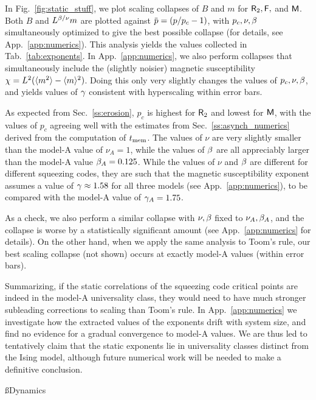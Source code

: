 \documentclass[pra,aps,twocolumn,groupedaddress,superscriptaddress,nofootinbib,preprintnumbers]{revtex4-2}
\begin{document}
	In Fig.~\ref{fig:static_stuff}, we plot scaling collapses of $B$ and $m$ for $\mathsf{R}_2,\mathsf{F},$ and $\mathsf{M}$. Both $B$ and $L^{\beta / \nu} m$ are plotted against $\ob p =  (p/p_c-1)$, with $p_c,\nu,\beta$ simultaneously optimized to give the best possible collapse (for details, see App.~\ref{app:numerics}). This analysis yields the values collected in Tab.~\ref{tab:exponents}. In App.~\ref{app:numerics}, we also perform collapses that simultaneously include the (slightly noisier) magnetic susceptibility $\chi = L^2 (\langle m^2 \rangle - \langle m\rangle^2)$. Doing this only very slightly changes the values of $p_c,\nu,\beta$, and yields values of $\gamma$ consistent with hyperscaling within error bars. 
	
	As expected from Sec.~\ref{ss:erosion}, $p_c$ is highest for $\mathsf{R}_2$ and lowest for $\mathsf{M}$, with the values of $p_c$ agreeing well with the estimates from Sec.~\ref{ss:asynch_numerics} derived from the computation of $t_{\rm mem}$. The values of $\nu$ are very slightly smaller than the model-A value of $\nu_A = 1$, while the values of $\beta$ are all appreciably larger than the model-A value $\beta_A= 0.125$. While the values of $\nu$ and $\beta$ are different for different squeezing codes, they are such that the magnetic susceptibility exponent assumes a value of $\gamma \approx 1.58$ for all three models (see App.~\ref{app:numerics}), to be compared with the model-A value of $\gamma_A = 1.75$. 
	
	As a check, we also perform a similar collapse with $\nu,\beta$ fixed to $\nu_A,\beta_A$, and the collapse is worse by a statistically significant amount (see  App.~\ref{app:numerics} for details). On the other hand, when we apply the same analysis to Toom's rule, our best scaling collapse (not shown) occurs at exactly model-A values (within error bars). 
	
	Summarizing, if the static correlations of the squeezing code critical points are indeed in the model-A universality class, they would need to have much stronger subleading corrections to scaling than Toom's rule. In App.~\ref{app:numerics} we investigate how the extracted values of the exponents drift with system size, and find no evidence for a gradual convergence to model-A values. We are thus led to tentatively claim that the static exponents lie in universality classes distinct from the Ising model, although future numerical work will be needed to make a definitive conclusion. 
	
	
	\ss{Dynamics} 
	
\end{document}
